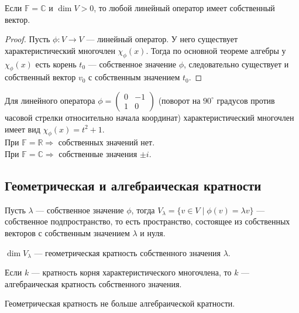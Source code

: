 \begin{Statement}
	Если $\mathbb{F} = \mathbb{C}$ и $\dim V > 0$, то любой линейный оператор имеет собственный вектор.
\end{Statement}

\begin{proof}
	Пусть $\phi: V \to V$ --- линейный оператор. У него существует характеристический многочлен $\chi_\phi(x)$. Тогда по основной теореме алгебры у $\chi_\phi(x)$ есть корень $t_0$ --- собственное значение $\phi$, следовательно существует и собственный вектор $v_0$  с собственным значением $t_0$.
\end{proof}

\begin{Examples}
	Для линейного оператора $\phi = \begin{pmatrix}
    0& -1 \\
    1& 0
    \end{pmatrix}$
    (поворот на $90^\circ$ градусов против часовой стрелки относительно начала координат) характеристический многочлен имеет вид $\chi_\phi(x) = t^2+1$.
    \\ При $\mathbb{F}  = \mathbb{R} \Rightarrow$ собственных значений нет.
    \\ При $\mathbb{F} = \mathbb{C} \Rightarrow$ собственные значения $\pm i$.
\end{Examples}

\subsection*{Геометрическая и алгебраическая кратности}

\begin{Def}
	Пусть $\lambda$ --- собственное значение $\phi$, тогда $V_\lambda = \{v \in V \; | \; \phi(v) = \lambda v\}$ --- собственное подпространство, то есть пространство, состоящее из собственных векторов с собственным значением $\lambda$ и нуля.
\end{Def}

\begin{Def}
	$\dim V_\lambda$ --- геометрическая кратность собственного значения $\lambda$.
\end{Def}

\begin{Def}
	Если $k$ --- кратность корня характеристического многочлена, то $k$ --- алгебраическая кратность собственного значения.
\end{Def}

\begin{Statement}
	Геометрическая кратность не больше алгебраической кратности.
\end{Statement}

